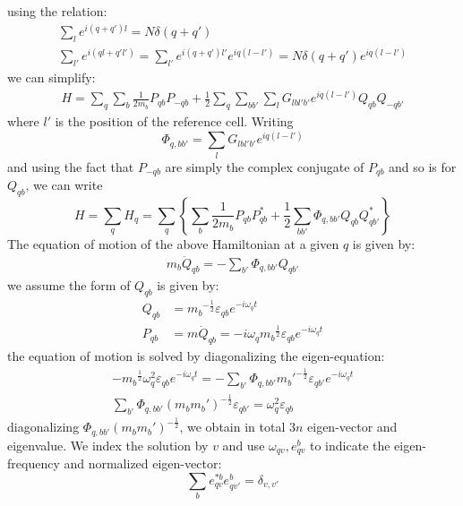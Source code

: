 \documentclass{article}
\begin{document}
using the relation:
\begin{gather}
    \sum_l e^{i(q+q')l} = N\delta(q+q') \\
    \sum_{l'} e^{i(ql+q'l')} = \sum_{l'} e^{i(q+q')l'} e^{iq(l-l')} = N\delta(q+q') e^{iq(l-l')}
\end{gather}
we can simplify:
\begin{align}
    H = \sum_{q} \sum_{b} \frac{1}{2m_b} P_{qb} P_{-qb}  
       + \frac{1}{2} \sum_{q} \sum_{bb'} \sum_{l} G_{lbl'b'} e^{iq(l-l')} Q_{qb} Q_{-qb'} 
\end{align}
where $l'$ is the position of the reference cell. Writing 
\begin{equation}
    \Phi_{q,bb'} = \sum_{l} G_{lbl'b'} e^{iq(l-l')}
\end{equation}
and using the fact that $P_{-qb}$ are simply the complex conjugate of $P_{qb}$ and so is for $Q_{qb}$, we can write
\begin{equation}
    H = \sum_{q} H_q = \sum_{q} \left\{ \sum_{b} \frac{1}{2m_b} P_{qb} P_{qb}^* + \frac{1}{2} \sum_{bb'} \Phi_{q,bb'} Q_{qb} Q_{qb'}^* \right\} \label{eq2}
\end{equation}
The equation of motion of the above Hamiltonian at a given $q$ is given by:
\begin{eqnarray}
    m_b \ddot{Q}_{qb} = - \sum_{b'} \Phi_{q,bb'} Q_{qb'}
\end{eqnarray}
we assume the form of $Q_{qb}$ is given by:
\begin{align}
    Q_{qb} &= {m_b}^{-\frac{1}{2}} \varepsilon_{qb} e^{-i\omega_{q}t} \\
    P_{qb} &= m\dot{Q}_{qb} = -i\omega_{q} {m_b}^{\frac{1}{2}} \varepsilon_{qb} e^{-i\omega_{q}t} 
\end{align}
the equation of motion is solved by diagonalizing the eigen-equation:
\begin{gather}
    - {m_b}^{\frac{1}{2}} \omega_{q}^2 \varepsilon_{qb} e^{-i\omega_{q}t} 
        = - \sum_{b'} \Phi_{q,bb'} {m_b'}^{-\frac{1}{2}} \varepsilon_{qb'} e^{-i\omega_{q}t} \\
    \sum_{b'} \Phi_{q,bb'} (m_b m_b')^{-\frac{1}{2}} \varepsilon_{qb'} = \omega_{q}^2 \varepsilon_{qb}
\end{gather}
diagonalizing $\Phi_{q,bb'} (m_b m_b')^{-\frac{1}{2}}$, we obtain in total $3n$ eigen-vector and eigenvalue.
We index the solution by $v$ and use $\omega_{qv}, e_{qv}^b$ to indicate the eigen-frequency and normalized eigen-vector:
\begin{equation}
    \sum_b e_{qv}^{*b} e_{qv'}^b = \delta_{v,v'}
\end{equation}
\end{document}
